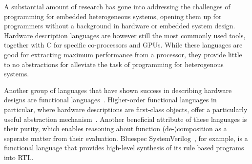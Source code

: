 \documentclass[../main.tex]{subfiles}
\begin{document}


A substantial amount of research has gone into addressing the challenges of programming for embedded heterogeneous systems, opening them up for programmers without a background in hardware or embedded system design. Hardware description languages are however still the most commonly used tools, together with C for specific co-processors and GPUs. While these languages are good for extracting maximum performance from a processor, they provide little to no abstractions for alleviate the task of programming for heterogenous systems.




Another group of languages that have shown success in describing hardware designs are functional languages~\cite{sheeran2005}. Higher-order functional languages in particular, where hardware descriptions are first-class objects, offer a particularly useful abstraction mechanism~\cite{baaij2010, bjesse1998, gill2010}. Another beneficial attribute of these languages is their purity, which enables reasoning about function (de-)composition as a seperate matter from their evaluation. Bluespec SystemVerilog~\cite{nikhil2004}, for example, is a functional language that provides high-level synthesis of its rule based programs into RTL.
\end{document}
